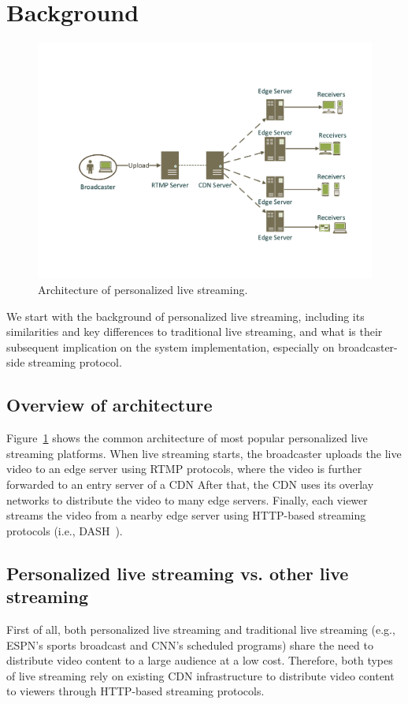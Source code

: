 \section{Background}

\begin{figure}[t]
\centerline{\includegraphics[width=0.9\columnwidth]{fig/architecture.pdf}}
\vspace{-0.08in}
\caption{Architecture of personalized live streaming.}
\vspace{-0.1in}
\label{fig:architecture}
\end{figure}

We start with the background of personalized live streaming, including
its similarities and key differences to traditional live streaming,
and what is their subsequent implication on the system implementation,
especially on broadcaster-side streaming protocol.

\subsection{Overview of architecture}
Figure~\ref{fig:architecture} shows the common architecture of
most popular personalized live streaming platforms.
When live streaming starts, the broadcaster uploads the live
video to an edge server using RTMP protocols, where the
video is further forwarded to an entry server of a CDN
After that, the CDN uses its overlay networks to distribute the
video to many edge servers.
Finally, each viewer streams the video from a nearby edge
server using HTTP-based streaming
protocols (i.e., DASH~\cite{dash}).

\subsection{Personalized live streaming vs. other live streaming}
First of all, both personalized live streaming and
traditional live streaming (e.g., ESPN's sports broadcast
and CNN's scheduled programs) share the need to
distribute video content to a large audience at  a low cost.
Therefore, both types of live streaming rely on existing
CDN infrastructure to distribute video content to viewers through HTTP-based streaming protocols.


